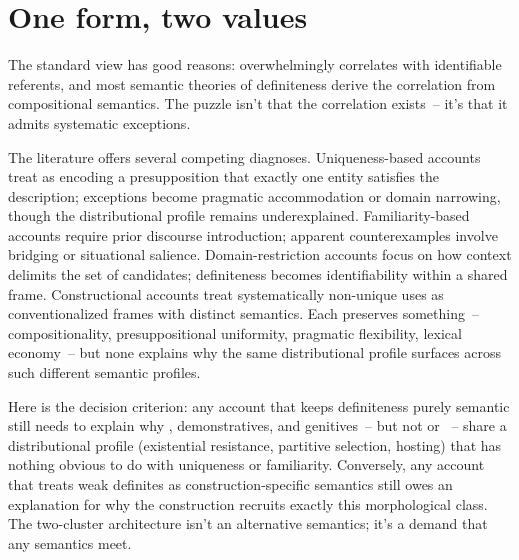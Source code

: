 \section{One form, two values}
\label{sec:10:two-functions}

The standard view has good reasons:  overwhelmingly correlates with identifiable referents, and most semantic theories of definiteness derive the correlation from compositional semantics. The puzzle isn't that the correlation exists~-- it's that it admits systematic exceptions.

The literature offers several competing diagnoses. Uniqueness-based accounts \citep{russell1905,heim1991} treat  as encoding a presupposition that exactly one entity satisfies the description; exceptions become pragmatic accommodation or domain narrowing, though the distributional profile remains underexplained. Familiarity-based accounts \citep{heim1982,christophersen1939} require prior discourse introduction; apparent counterexamples involve bridging or situational salience. Domain-restriction accounts \citep{hawkins1978,roberts2003} focus on how context delimits the set of candidates; definiteness becomes identifiability within a shared frame. Constructional accounts \citep{carlsonsussman2005,aguilarguevarazwarts2010} treat systematically non-unique uses as conventionalized frames with distinct semantics. Each preserves something~-- compositionality, presuppositional uniformity, pragmatic flexibility, lexical economy~-- but none explains why the same distributional profile surfaces across such different semantic profiles.

Here is the decision criterion: any account that keeps definiteness purely semantic still needs to explain why , demonstratives, and genitives~-- but not  or ~-- share a distributional profile (existential resistance, partitive selection, hosting) that has nothing obvious to do with uniqueness or familiarity. Conversely, any account that treats weak definites as construction-specific semantics still owes an explanation for why the construction recruits exactly this morphological class. The two-cluster architecture isn't an alternative semantics; it's a demand that any semantics meet.

